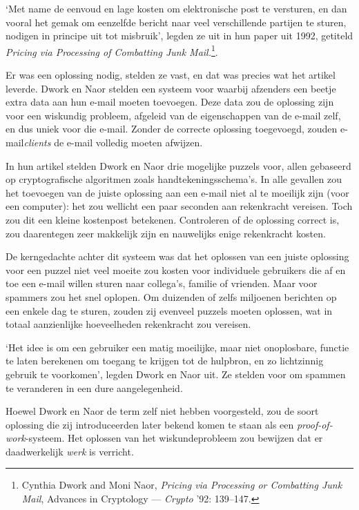 \documentclass[
  a5paper,
  smalldemyvopaper,11pt,twoside,onecolumn,openright,extrafontsizes,
hidelinks]{memoir}
\begin{document}
`Met name de eenvoud en lage kosten om elektronische post te versturen,
en dan vooral het gemak om eenzelfde bericht naar veel verschillende
partijen te sturen, nodigen in principe uit tot misbruik', legden ze uit
in hun paper uit 1992, getiteld \emph{Pricing via Processing of
Combatting Junk Mail.}\footnote{Cynthia Dwork and Moni Naor,
  \emph{Pricing via Processing or Combatting Junk Mail}, Advances in
  Cryptology --- \emph{Crypto} '92: 139--147.}.

Er was een oplossing nodig, stelden ze vast, en dat was precies wat het
artikel leverde. Dwork en Naor stelden een systeem voor waarbij
afzenders een beetje extra data aan hun e-mail moeten toevoegen. Deze
data zou de oplossing zijn voor een wiskundig probleem, afgeleid van de
eigenschappen van de e-mail zelf, en dus uniek voor die e-mail. Zonder
de correcte oplossing toegevoegd, zouden e-mail\emph{clients} de e-mail
volledig moeten afwijzen.

In hun artikel stelden Dwork en Naor drie mogelijke puzzels voor, allen
gebaseerd op cryptografische algoritmen zoals handtekeningsschema's. In
alle gevallen zou het toevoegen van de juiste oplossing aan een e-mail
niet al te moeilijk zijn (voor een computer): het zou wellicht een paar
seconden aan rekenkracht vereisen. Toch zou dit een kleine kostenpost
betekenen. Controleren of de oplossing correct is, zou daarentegen zeer
makkelijk zijn en nauwelijks enige rekenkracht kosten.

De kerngedachte achter dit systeem was dat het oplossen van een juiste
oplossing voor een puzzel niet veel moeite zou kosten voor individuele
gebruikers die af en toe een e-mail willen sturen naar collega's,
familie of vrienden. Maar voor spammers zou het snel oplopen. Om
duizenden of zelfs miljoenen berichten op een enkele dag te sturen,
zouden zij evenveel puzzels moeten oplossen, wat in totaal aanzienlijke
hoeveelheden rekenkracht zou vereisen.

`Het idee is om een gebruiker een matig moeilijke, maar niet
onoplosbare, functie te laten berekenen om toegang te krijgen tot de
hulpbron, en zo lichtzinnig gebruik te voorkomen', legden Dwork en Naor
uit. Ze stelden voor om spammen te veranderen in een dure
aangelegenheid.

Hoewel Dwork en Naor de term zelf niet hebben voorgesteld, zou de soort
oplossing die zij introduceerden later bekend komen te staan als een
\emph{proof-of-work}-systeem. Het oplossen van het wiskundeprobleem zou
bewijzen dat er daadwerkelijk \emph{werk} is verricht.
\end{document}
